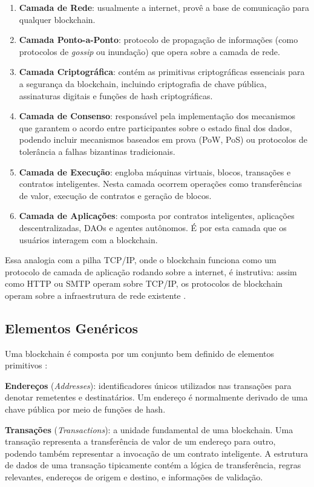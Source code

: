 \documentclass[12pt,a4paper]{report}
\begin{document}
\begin{enumerate}
    \item \textbf{Camada de Rede}: usualmente a internet, provê a base de comunicação para qualquer blockchain.
    \item \textbf{Camada Ponto-a-Ponto}: protocolo de propagação de informações (como protocolos de \textit{gossip} ou inundação) que opera sobre a camada de rede.
    \item \textbf{Camada Criptográfica}: contém as primitivas criptográficas essenciais para a segurança da blockchain, incluindo criptografia de chave pública, assinaturas digitais e funções de hash criptográficas.
    \item \textbf{Camada de Consenso}: responsável pela implementação dos mecanismos que garantem o acordo entre participantes sobre o estado final dos dados, podendo incluir mecanismos baseados em prova (PoW, PoS) ou protocolos de tolerância a falhas bizantinas tradicionais.
    \item \textbf{Camada de Execução}: engloba máquinas virtuais, blocos, transações e contratos inteligentes. Nesta camada ocorrem operações como transferências de valor, execução de contratos e geração de blocos.
    \item \textbf{Camada de Aplicações}: composta por contratos inteligentes, aplicações descentralizadas, DAOs e agentes autônomos. É por esta camada que os usuários interagem com a blockchain.
\end{enumerate}

Essa analogia com a pilha TCP/IP, onde o blockchain funciona como um protocolo de camada de aplicação rodando sobre a internet, é instrutiva: assim como HTTP ou SMTP operam sobre TCP/IP, os protocolos de blockchain operam sobre a infraestrutura de rede existente \cite{Bashir2023}.

\subsection{Elementos Genéricos}

Uma blockchain é composta por um conjunto bem definido de elementos primitivos \cite{Bashir2023}:

\textbf{Endereços} (\textit{Addresses}): identificadores únicos utilizados nas transações para denotar remetentes e destinatários. Um endereço é normalmente derivado de uma chave pública por meio de funções de hash.

\textbf{Transações} (\textit{Transactions}): a unidade fundamental de uma blockchain. Uma transação representa a transferência de valor de um endereço para outro, podendo também representar a invocação de um contrato inteligente. A estrutura de dados de uma transação tipicamente contém a lógica de transferência, regras relevantes, endereços de origem e destino, e informações de validação.
\end{document}
